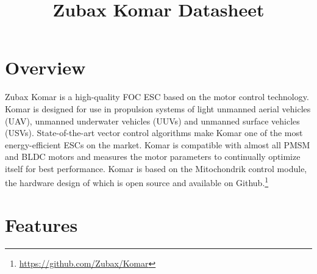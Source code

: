 \documentclass{zubaxdoc}
\title{Zubax Komar Datasheet}
\begin{document}
\frontmatter
\begin{titlepage}

\section*{Overview}

Zubax Komar is a high-quality FOC ESC based on the  motor control technology. Komar is designed for
use in propulsion systems of light unmanned aerial vehicles (UAV), unmanned underwater vehicles (UUVs) and
unmanned surface vehicles (USVs). State-of-the-art vector control algorithms make Komar one of the most
energy-efficient ESCs on the market. Komar is compatible with almost all PMSM and BLDC motors and measures
the motor parameters to continually optimize itself for best performance. Komar is based on the Mitochondrik
control module, the hardware design of which is open source and available on
Github.\footnote{\url{https://github.com/Zubax/Komar}}

\section*{Features}


\end{titlepage}
\end{document}
